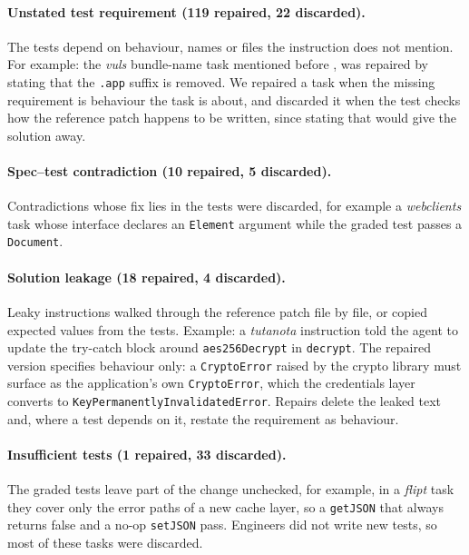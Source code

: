 %

\paragraph{Unstated test requirement (119 repaired, 22 discarded).}
The tests depend on behaviour, names or files the instruction does not mention. For example: the \textit{vuls} bundle-name task mentioned before , was repaired by stating that the \texttt{.app} suffix is removed. We repaired a task when the missing requirement is behaviour the task is about, and discarded it when the test checks how the reference patch happens to be written, since stating that would give the solution away. %

\paragraph{Spec--test contradiction (10 repaired, 5 discarded).}
Contradictions whose fix lies in the tests were discarded, for example a \textit{webclients} task whose interface declares an \texttt{Element} argument while the graded test passes a \texttt{Document}.

\paragraph{Solution leakage (18 repaired, 4 discarded).}
Leaky instructions walked through the reference patch file by file, or copied expected values from the tests. Example: a \textit{tutanota} instruction told the agent to update the try-catch block around \texttt{aes256Decrypt} in \texttt{decrypt}. The repaired version specifies behaviour only: a \texttt{CryptoError} raised by the crypto library must surface as the application's own \texttt{CryptoError}, which the credentials layer converts to \texttt{KeyPermanentlyInvalidatedError}. Repairs delete the leaked text and, where a test depends on it, restate the requirement as behaviour. 

\paragraph{Insufficient tests (1 repaired, 33 discarded).}
The graded tests leave part of the change unchecked, for example, in a \textit{flipt} task they cover only the error paths of a new cache layer, so a \texttt{getJSON} that always returns false and a no-op \texttt{setJSON} pass. Engineers did not write new tests, so most of these tasks were discarded. 


